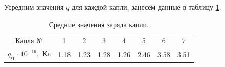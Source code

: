 \documentclass[a4paper, 12pt, twoside]{article}
\begin{document}
Усредним значения $q$ для каждой капли, занесём данные в таблицу \ref{t2}.

\begin{table}[H]
	\centering
	\caption{Средние значения заряда капли.}
	\label{t2}
		\begin{tabular}{c|ccccccc} \toprule
			Капля № & 1&2&3&4&5&6&7  \\
			$q_{\text{ср}}\cdot 10^{-19},$ Кл    & 1.18	 & 1.23     &  1.28    & 1.26     & 2.46 & 3.58& 3.51 \\ \bottomrule   
		\end{tabular}
\end{table}
\end{document}

